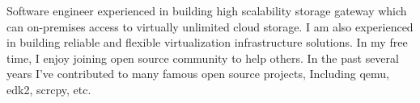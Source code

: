 

\begin{cvparagraph}

Software engineer experienced in building high scalability storage gateway which can on-premises access to virtually unlimited cloud storage. I am also experienced in building reliable and flexible virtualization infrastructure solutions. In my free time, I enjoy joining open source community to help others. In the past several years I've contributed to many famous open source projects, Including qemu, edk2, scrcpy, etc.
\end{cvparagraph}
